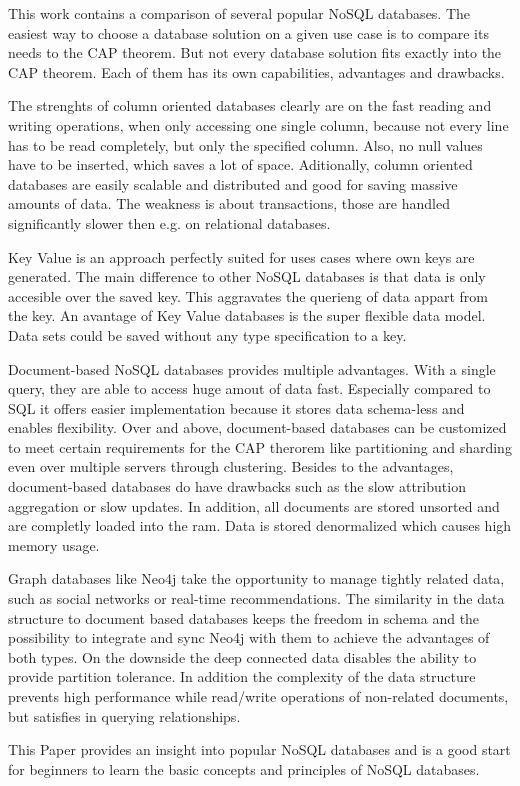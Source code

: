 This work contains a comparison of several popular NoSQL databases.
The easiest way to choose a database solution on a given use case is to compare its needs to the CAP theorem.
But not every database solution fits exactly into the CAP theorem.
Each of them has its own capabilities, advantages and drawbacks.

The strenghts of column oriented databases clearly are on the fast reading and writing operations, when only accessing one single column, because not every line has to be read completely, but only the specified column.
Also, no null values have to be inserted, which saves a lot of space. Aditionally, column oriented databases are easily scalable and distributed and good for saving massive amounts of data.
The weakness is about transactions, those are handled significantly slower then e.g. on relational databases.

Key Value is an approach perfectly suited for uses cases where own keys are generated.
The main difference to other NoSQL databases is that data is only accesible over the saved key.
This aggravates the querieng of data appart from the key.
An avantage of Key Value databases is the super flexible data model.
Data sets could be saved without any type specification to a key.

Document-based NoSQL databases provides multiple advantages. With a single query, they are able to access huge amout of data fast. Especially compared to SQL it offers easier implementation because it stores data schema-less and enables flexibility. Over and above, document-based databases can be customized to meet certain requirements for the CAP therorem like partitioning and sharding even over multiple servers through clustering. Besides to the advantages, document-based databases do have drawbacks such as the slow attribution aggregation or slow updates. In addition, all documents are stored unsorted and are completly loaded into the ram. Data is stored denormalized which causes high memory usage.

Graph databases like Neo4j take the opportunity to manage tightly related data, such as social networks or real-time recommendations. The similarity in the data structure to document based databases keeps the freedom in schema and the possibility to integrate and sync Neo4j with them to achieve the advantages of both types.
On the downside the deep connected data disables the ability to provide partition tolerance. In addition the complexity of the data structure prevents high performance while read/write operations of non-related documents, but satisfies in querying relationships.

This Paper provides an insight into popular NoSQL databases and is a good start for beginners to learn the basic concepts and principles of NoSQL databases.